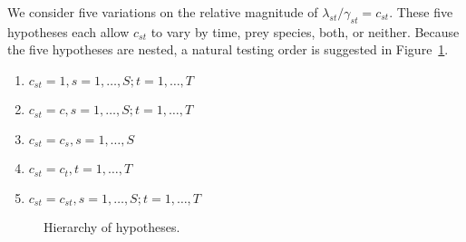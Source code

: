 
We consider five variations on the relative magnitude of $\lambda_{st}/\gamma_{st} = c_{st}$.  These five hypotheses each allow $c_{st}$ to vary by time, prey species, both, or neither.  Because the five hypotheses are nested, a natural testing order is suggested in Figure~\ref{fig:hier}.

\begin{enumerate}
\item $c_{st} = 1, s = 1, \ldots, S; t = 1, \ldots, T$
\item $c_{st} = c, s = 1, \ldots, S; t = 1, \ldots, T$
\item $c_{st} = c_s, s = 1, \ldots, S$
\item $c_{st} = c_t, t = 1, \ldots, T$
\item $c_{st} = c_{st}, s = 1, \ldots, S; t = 1, \ldots, T$
\end{enumerate}

\begin{figure}
  \centering
  
  \caption{Hierarchy of hypotheses.}
  \label{fig:hier}
\end{figure}

